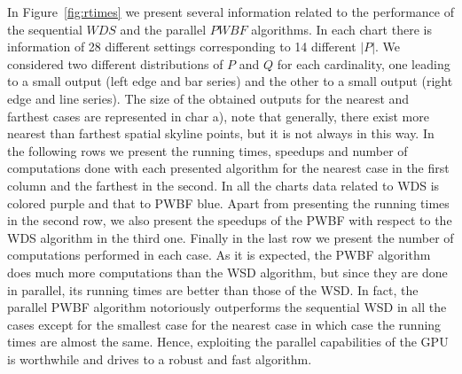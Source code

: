 \documentclass[11pt,onecolumn]{elsart3p}
\begin{document}
In Figure~\ref{fig:rtimes} we present several information related to the performance of the sequential $WDS$ and the parallel $PWBF$ algorithms. In each chart there is information of 28 different settings corresponding to 14 different $|P|$. We considered two different distributions of $P$ and $Q$ for each cardinality, one leading to a small output (left edge and bar series) and the other to a small output (right edge and line series). The size of the obtained outputs for the nearest and farthest cases are represented in char a), note that generally, there exist more nearest than farthest spatial skyline points, but it is not always in this way. In the following rows we present the running times, speedups and number of computations done with each presented algorithm for the nearest case in the first column and the farthest in the second. In all the charts data related to WDS is colored purple and that to PWBF blue. Apart from presenting the running times in the second row, we also present the speedups of the PWBF with respect to the WDS algorithm in the third one. Finally in the last row we present the number of computations performed in each case. As it is expected, the PWBF algorithm does much more computations than the WSD algorithm, but since they are done in parallel, its running times are better than those of the WSD. In fact, the parallel PWBF algorithm notoriously outperforms the sequential WSD in all the cases except for the smallest case for the nearest case in which case the running times are almost the same. Hence, exploiting the parallel capabilities of the GPU is worthwhile and drives to a robust and fast algorithm.
\end{document}
